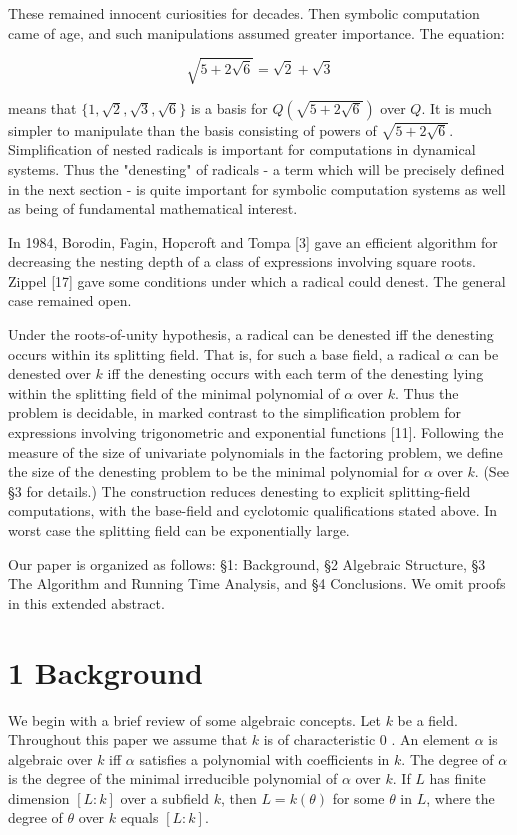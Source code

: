 \documentclass[11pt,letterpaper]{article}
\begin{document}
These remained innocent curiosities for decades. Then symbolic computation came of age, and such manipulations assumed greater importance. The equation:

\[
\sqrt{5+2 \sqrt{6}}=\sqrt{2}+\sqrt{3}
\]

means that $\{1, \sqrt{2}, \sqrt{3}, \sqrt{6}\}$ is a basis for $Q(\sqrt{5+2 \sqrt{6}})$ over $Q$. It is much simpler to manipulate than the basis consisting of powers of $\sqrt{5+2 \sqrt{6}}$. Simplification of nested radicals is important for computations in dynamical systems. Thus the "denesting" of radicals - a term which will be precisely defined in the next section - is quite important for symbolic computation systems as well as being of fundamental mathematical interest.

In 1984, Borodin, Fagin, Hopcroft and Tompa [3] gave an efficient algorithm for decreasing the nesting depth of a class of expressions involving square roots. Zippel [17] gave some conditions under which a radical could denest. The general case remained open.

Under the roots-of-unity hypothesis, a radical can be denested iff the denesting occurs within its splitting field. That is, for such a base field, a radical $\alpha$ can be denested over $k$ iff the denesting occurs with each term of the denesting lying within the splitting field of the minimal polynomial of $\alpha$ over $k$. Thus the problem is decidable, in marked contrast to the simplification problem for expressions involving trigonometric and exponential functions [11]. Following the measure of the size of univariate polynomials in the factoring problem, we define the size of the denesting problem to be the minimal polynomial for $\alpha$ over $k$. (See §3 for details.) The construction reduces denesting to explicit splitting-field computations, with the base-field and cyclotomic qualifications stated above. In worst case the splitting field can be exponentially large.

Our paper is organized as follows: §1: Background, §2 Algebraic Structure, §3 The Algorithm and Running Time Analysis, and §4 Conclusions. We omit proofs in this extended abstract.

\section*{1 Background}
We begin with a brief review of some algebraic concepts. Let $k$ be a field. Throughout this paper we assume that $k$ is of characteristic 0 . An element $\alpha$ is algebraic over $k$ iff $\alpha$ satisfies a polynomial with coefficients in $k$. The degree of $\alpha$ is the degree of the minimal irreducible polynomial of $\alpha$ over $k$. If $L$ has finite dimension $[L: k]$ over a subfield $k$, then $L=k(\theta)$ for some $\theta$ in $L$, where the degree of $\theta$ over $k$ equals $[L: k]$.
\end{document}
